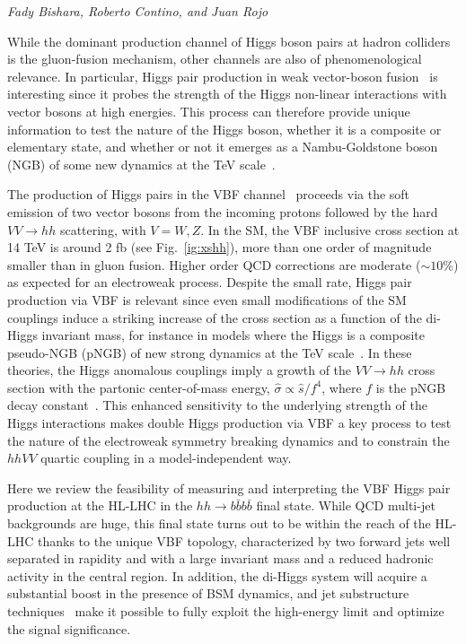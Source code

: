 \begin{center}
\textit{Fady Bishara, Roberto Contino, and Juan Rojo}
\end{center}

While the dominant production channel of Higgs boson pairs at hadron colliders is the gluon-fusion mechanism, other channels are also of phenomenological relevance. In particular, Higgs pair production in weak vector-boson fusion~\cite{Bishara:2016kjn} is interesting since it probes the
strength of the  Higgs non-linear interactions with vector bosons at high
energies. This process can therefore provide unique information
to test the nature of the Higgs boson,
whether it is a composite or elementary state, and whether or not it emerges as
a Nambu-Goldstone boson (NGB) of some new dynamics at the TeV
scale~\cite{Giudice:2007fh,Contino:2010mh,Contino:2013gna}.

The production of Higgs pairs in the  VBF
channel~\cite{Giudice:2007fh,Contino:2010mh,Dolan:2013rja,Brooijmans:2014eja,Liu-Sheng:2014gxa,Dolan:2015zja} proceeds via the soft emission of two vector bosons from the incoming protons  followed by 
the hard $VV \to hh$ scattering, with $V=W,Z$.
%
In the SM, the VBF inclusive cross section
at 14 TeV is around 2 fb (see Fig.~\ref{ig:xshh}), more than one
order of magnitude smaller than in gluon fusion.
Higher order QCD corrections are moderate ($\sim 10\%$) as
expected for an electroweak process.
%
Despite the small rate, Higgs pair production via VBF is relevant since
even small modifications of the SM couplings induce a striking increase of the
cross section as a function of the di-Higgs invariant mass, for instance in models 
where the Higgs is a composite pseudo-NGB (pNGB) of new strong dynamics at the TeV scale~\cite{Kaplan:1983fs}.
%
In these theories, the Higgs anomalous couplings imply a growth of the $VV\to hh$ cross section with the
partonic center-of-mass energy, $\hat{\sigma} \propto \hat s/f^4$, where $f$ is the pNGB decay constant~\cite{Giudice:2007fh}.
%
This enhanced sensitivity to the underlying strength of the Higgs interactions makes 
double Higgs production via VBF a key process to test the nature of the
electroweak symmetry breaking dynamics
and to constrain the $hhVV$ quartic coupling in a model-independent way.

Here we review the feasibility of measuring and interpreting
the VBF Higgs pair production at the HL-LHC in
the $hh\to b\bar{b}b\bar{b}$ final state.
%
While QCD multi-jet backgrounds are huge, this final state turns out
to be within the reach of the HL-LHC thanks to the unique VBF topology,
characterized by two forward jets well separated in rapidity and with a large
invariant mass and a reduced hadronic activity in the central region. 
In addition, the di-Higgs system will acquire a substantial boost
in the presence of BSM dynamics, and jet
substructure techniques~\cite{Salam:2009jx,Gouzevitch:2013qca,Behr:2015oqq} 
make it possible to fully exploit the
high-energy limit and optimize the signal significance.

